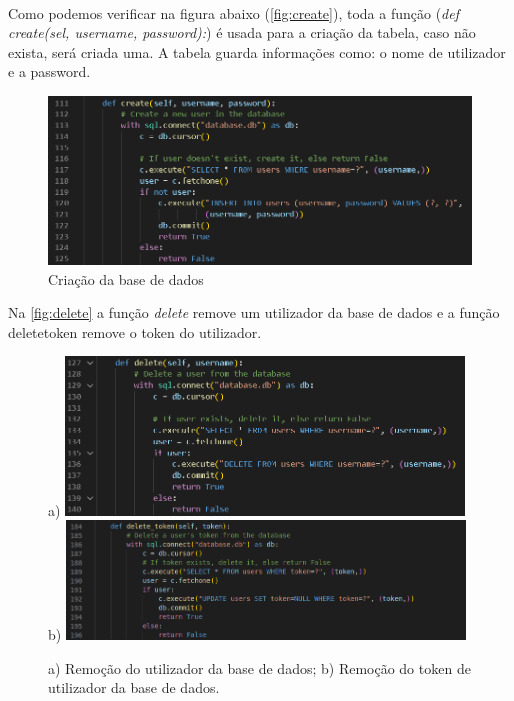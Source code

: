 \documentclass[a4paper, 11pt, oneside]{report}
\begin{document}
\paragraph{} Como podemos verificar na figura abaixo (\autoref{fig:create}), toda a função (\textit{def create(sel, username, password):}) é usada para a criação da tabela, caso não exista, será criada uma. A tabela guarda informações como: o nome de utilizador e a password.

\begin{figure}[h]
\center
\includegraphics[width=320pt]{createDB.png}
\caption{Criação da base de dados}
\label{fig:create}
\end{figure}

\indent Na \autoref{fig:delete} a função \textit{delete} remove um utilizador da base de dados e a função delete\textunderscore token remove o token do utilizador.

\begin{figure}[h]
    \center
    a) \includegraphics[width=300pt]{deleteDB.png} \\
    b) \includegraphics[width=300pt]{deletetokenDB.png}
    \caption{a) Remoção do utilizador da base de dados; b) Remoção do token de utilizador da base de dados.}
    \label{fig:delete}
\end{figure}
\end{document}
